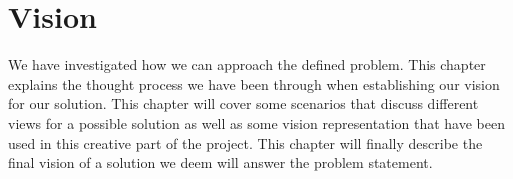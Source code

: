 
\chapter{Vision}
\label{cha:vision}

We have investigated how we can approach the defined problem. This chapter explains the thought process we have been through when establishing our vision for our solution. This chapter will cover some scenarios that discuss different views for a possible solution as well as some vision representation that have been used in this creative part of the project. This chapter will finally describe the final vision of a solution we deem will answer the problem statement.








